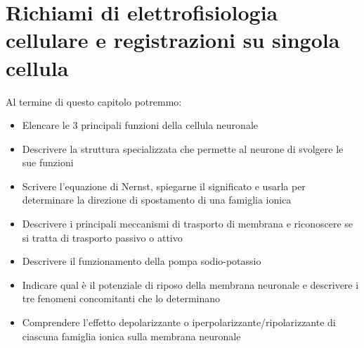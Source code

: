 \chapter{Richiami di elettrofisiologia cellulare e
registrazioni su singola cellula}
Al termine di questo capitolo potremmo:
\begin{itemize}
    \item Elencare le 3 principali funzioni della cellula neuronale
    \item Descrivere la struttura specializzata che permette al neurone di svolgere le sue funzioni
    \item Scrivere l’equazione di Nernst, spiegarne il significato e usarla per determinare la direzione di spostamento di una famiglia ionica
    \item Descrivere i principali meccanismi di trasporto di membrana e
riconoscere se si tratta di trasporto passivo o attivo
    \item Descrivere il funzionamento della pompa sodio-potassio
    \item Indicare qual è il potenziale di riposo della membrana neuronale e
descrivere i tre fenomeni concomitanti che lo determinano
    \item Comprendere l’effetto depolarizzante o iperpolarizzante/ripolarizzante di ciascuna famiglia ionica sulla membrana neuronale
\end{itemize}

